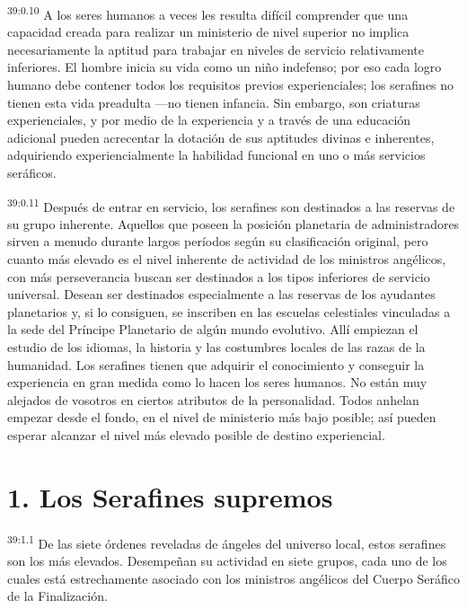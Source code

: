 \par
\textsuperscript{39:0.10} A los seres humanos a veces les resulta difícil comprender que una capacidad creada para realizar un ministerio de nivel superior no implica necesariamente la aptitud para trabajar en niveles de servicio relativamente inferiores. El hombre inicia su vida como un niño indefenso; por eso cada logro humano debe contener todos los requisitos previos experienciales; los serafines no tienen esta vida preadulta ---no tienen infancia. Sin embargo, son criaturas experienciales, y por medio de la experiencia y a través de una educación adicional pueden acrecentar la dotación de sus aptitudes divinas e inherentes, adquiriendo experiencialmente la habilidad funcional en uno o más servicios seráficos.

\par
\textsuperscript{39:0.11} Después de entrar en servicio, los serafines son destinados a las reservas de su grupo inherente. Aquellos que poseen la posición planetaria de administradores sirven a menudo durante largos períodos según su clasificación original, pero cuanto más elevado es el nivel inherente de actividad de los ministros angélicos, con más perseverancia buscan ser destinados a los tipos inferiores de servicio universal. Desean ser destinados especialmente a las reservas de los ayudantes planetarios y, si lo consiguen, se inscriben en las escuelas celestiales vinculadas a la sede del Príncipe Planetario de algún mundo evolutivo. Allí empiezan el estudio de los idiomas, la historia y las costumbres locales de las razas de la humanidad. Los serafines tienen que adquirir el conocimiento y conseguir la experiencia en gran medida como lo hacen los seres humanos. No están muy alejados de vosotros en ciertos atributos de la personalidad. Todos anhelan empezar desde el fondo, en el nivel de ministerio más bajo posible; así pueden esperar alcanzar el nivel más elevado posible de destino experiencial.

\section*{1. Los Serafines supremos}
\par
\textsuperscript{39:1.1} De las siete órdenes reveladas de ángeles del universo local, estos serafines son los más elevados. Desempeñan su actividad en siete grupos, cada uno de los cuales está estrechamente asociado con los ministros angélicos del Cuerpo Seráfico de la Finalización.

